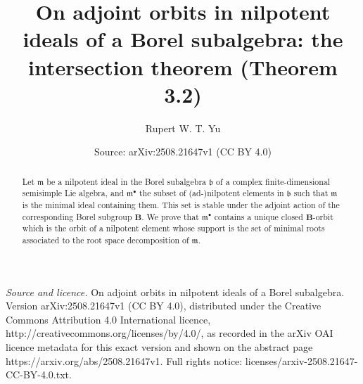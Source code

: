 \documentclass[10pt,a4paper]{amsart}
\title[On adjoint orbits in nilpotent ideals of a Borel subalgebra]{On adjoint orbits in nilpotent ideals of a Borel subalgebra: the intersection theorem (Theorem 3.2)}
\author[Rupert Yu]{Rupert W. T. Yu}
\date{Source: arXiv:2508.21647v1 (CC BY 4.0)}
\newcommand{\group}[1]{\mathbf{#1}}
\numberwithin{equation}{section}
\theoremstyle{plain}
\theoremstyle{definition}
\theoremstyle{remark}
\begin{document}
\begin{abstract}
Let $\mathfrak{m}$ be a nilpotent ideal in the Borel subalgebra $\mathfrak{b}$ of a complex
finite-dimensional semisimple Lie algebra, and $\mathfrak{m}^{\bullet}$ the subset of
(ad-)nilpotent elements in $\mathfrak{b}$ such that $\mathfrak{m}$ is the minimal ideal containing them.
This set is stable under the adjoint action of the corresponding Borel subgroup $\group{B}$. We prove that
$\mathfrak{m}^{\bullet}$ contains a unique closed $\group{B}$-orbit which is the orbit of a nilpotent
element whose support is the set of minimal roots associated to the root space decomposition
of $\mathfrak{m}$.
\end{abstract}
\maketitle

\noindent\emph{Source and licence.} On adjoint orbits in nilpotent ideals of a Borel subalgebra. Version arXiv:2508.21647v1 (CC BY 4.0), distributed under the Creative Commons Attribution 4.0 International licence, http://creativecommons.org/licenses/by/4.0/, as recorded in the arXiv OAI licence metadata for this exact version and shown on the abstract page https://arxiv.org/abs/2508.21647v1. Full rights notice: licenses/arxiv-2508.21647-CC-BY-4.0.txt.\par\smallskip
\end{document}
